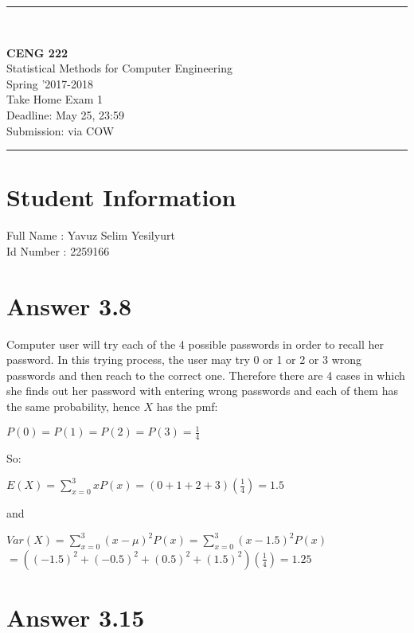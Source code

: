 \documentclass[12pt]{article}
\newcommand{\HRule}{\rule{\linewidth}{1mm}}
\begin{document}
\noindent
\HRule \\[3mm]
\begin{flushright}

                                         \LARGE \textbf{CENG 222}  \\[4mm]
                                         \Large Statistical Methods for Computer Engineering \\[4mm]
                                        \normalsize      Spring '2017-2018 \\
                                           \Large   Take Home Exam 1 \\
                    \normalsize Deadline: May 25, 23:59 \\
                    \normalsize Submission: via COW
\end{flushright}
\HRule

\section*{Student Information }
Full Name : Yavuz Selim Yesilyurt \\
Id Number : 2259166 \\

\section*{Answer 3.8}
Computer user will try each of the 4 possible passwords in order to recall her password. In this trying process, the user may try 0 or 1 or 2 or 3 wrong passwords and then reach to the correct one. Therefore there are 4 cases in which she finds out her password with entering wrong passwords and each of them has the same probability, hence $X$ has the pmf:
\begin{center}
$P(0)=P(1)=P(2)=P(3)=\frac{1}{4}$ 
\end{center}
So:
\begin{center}
$E(X)=\sum_{x=0}^{3} xP(x) = (0+1+2+3)(\frac{1}{4})=1.5$
\end{center}
and
\begin{center}
$Var(X)=\sum_{x=0}^{3} (x-\mu)^2P(x)=\sum_{x=0}^{3} (x-1.5)^2P(x)$
$=((-1.5)^2+(-0.5)^2+(0.5)^2+(1.5)^2)(\frac{1}{4})=1.25$
\end{center}

\section*{Answer 3.15}
\end{document}
